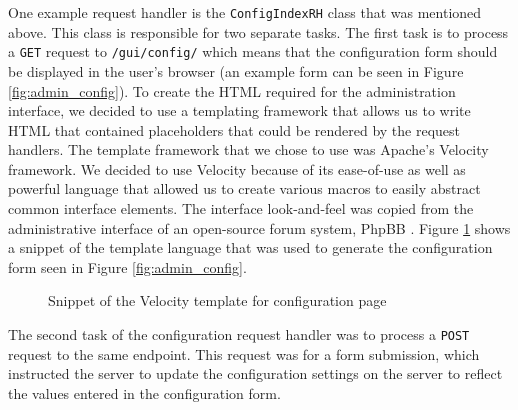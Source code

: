 One example request handler is the \texttt{ConfigIndexRH} class that was mentioned above. This class is responsible for two separate tasks. The first task is to process a \texttt{GET} request to \texttt{/gui/config/} which means that the configuration form should be displayed in the user's browser (an example form can be seen in Figure \ref{fig:admin_config}). To create the HTML required for the administration interface, we decided to use a templating framework that allows us to write HTML that contained placeholders that could be rendered by the request handlers. The template framework that we chose to use was Apache's Velocity \cite{velocity} framework. We decided to use Velocity because of its ease-of-use as well as powerful language that allowed us to create various macros to easily abstract common interface elements. The interface look-and-feel was copied from the administrative interface of an open-source forum system, PhpBB \cite{phpbb}. Figure \ref{code:tpl_config} shows a snippet of the template language that was used to generate the configuration form seen in Figure \ref{fig:admin_config}.

\begin{figure}[h!]
  \centering
  \small
  
  \normalsize
  \caption{Snippet of the Velocity template for configuration page}
  \label{code:tpl_config}
\end{figure}

The second task of the configuration request handler was to process a \texttt{POST} request to the same endpoint. This request was for a form submission, which instructed the server to update the configuration settings on the server to reflect the values entered in the configuration form.